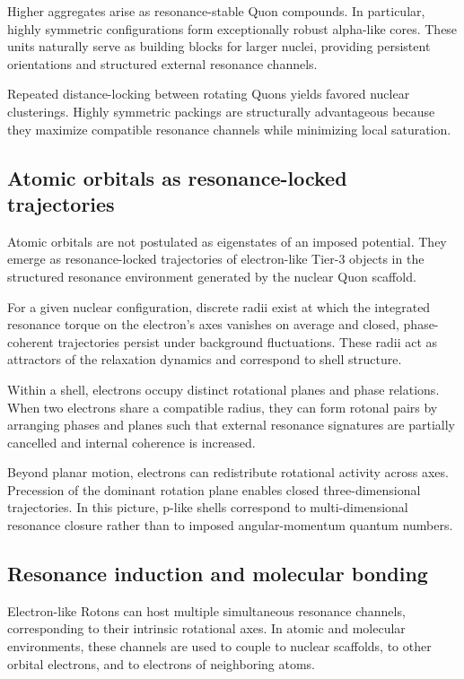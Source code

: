 \documentclass[11pt,a4paper]{article}
\begin{document}
Higher aggregates arise as resonance-stable Quon compounds. In particular, highly symmetric
configurations form exceptionally robust alpha-like cores. These units naturally
serve as building blocks for larger nuclei, providing persistent orientations and structured
external resonance channels.

Repeated distance-locking between rotating Quons yields favored nuclear clusterings.
Highly symmetric packings are structurally advantageous because they maximize compatible
resonance channels while minimizing local saturation.

\subsection{Atomic orbitals as resonance-locked trajectories}

Atomic orbitals are not postulated as eigenstates of an imposed potential. They emerge as
resonance-locked trajectories of electron-like Tier-3 objects in the structured resonance
environment generated by the nuclear Quon scaffold.

For a given nuclear configuration, discrete radii exist at which the integrated resonance
torque on the electron’s axes vanishes on average and closed, phase-coherent trajectories
persist under background fluctuations. These radii act as attractors of the relaxation
dynamics and correspond to shell structure.

Within a shell, electrons occupy distinct rotational planes and phase relations. When two
electrons share a compatible radius, they can form rotonal pairs by arranging phases and
planes such that external resonance signatures are partially cancelled and internal
coherence is increased.

Beyond planar motion, electrons can redistribute rotational activity across axes.
Precession of the dominant rotation plane enables closed three-dimensional trajectories.
In this picture, p-like shells correspond to multi-dimensional resonance closure rather
than to imposed angular-momentum quantum numbers.

\subsection{Resonance induction and molecular bonding}

Electron-like Rotons can host multiple simultaneous resonance channels, corresponding to
their intrinsic rotational axes. In atomic and molecular environments, these channels are
used to couple to nuclear scaffolds, to other orbital electrons, and to electrons of
neighboring atoms.
\end{document}
